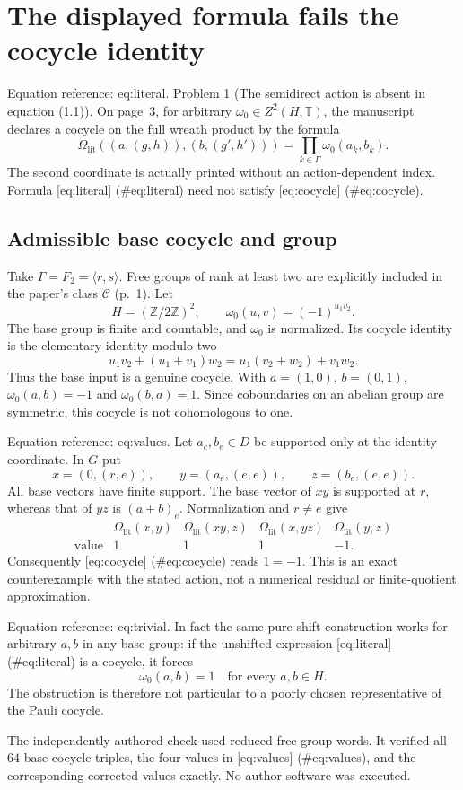 \documentclass[10pt]{article}
\begin{document}
\section*{The displayed formula fails the cocycle identity}
Equation reference: eq:literal. Problem 1 (The semidirect action is absent in equation (1.1)).  On page 3, for arbitrary \(\omega_0\in Z^2(H,\mathbb T)\), the manuscript declares a cocycle on the full wreath product by the formula \[
 \Omega_{\mathrm{lit}}((a,(g,h)),(b,(g',h')))
   =\prod_{k\in\Gamma}\omega_0(a_k,b_k).\] The second coordinate is actually printed without an action-dependent index. Formula [eq:literal] (\#eq:literal) need not satisfy [eq:cocycle] (\#eq:cocycle).\par
\subsection*{Admissible base cocycle and group}
Take \(\Gamma=F_2=\langle r,s\rangle\). Free groups of rank at least two are explicitly included in the paper’s class \(\mathcal C\) (p. 1). Let \[H=(\mathbb Z/2\mathbb Z)^2,\qquad
 \omega_0(u,v)=(-1)^{u_1v_2}.\] The base group is finite and countable, and \(\omega_0\) is normalized. Its cocycle identity is the elementary identity modulo two \[u_1v_2+(u_1+v_1)w_2=u_1(v_2+w_2)+v_1w_2.\] Thus the base input is a genuine cocycle. With \(a=(1,0)\), \(b=(0,1)\), \(\omega_0(a,b)=-1\) and \(\omega_0(b,a)=1\). Since coboundaries on an abelian group are symmetric, this cocycle is not cohomologous to one.\par
Equation reference: eq:values. Let \(a_e,b_e\in D\) be supported only at the identity coordinate. In \(G\) put \[x=(0,(r,e)),\qquad
 y=(a_e,(e,e)),\qquad
 z=(b_e,(e,e)).\] All base vectors have finite support. The base vector of \(xy\) is supported at \(r\), whereas that of \(yz\) is \((a+b)_e\). Normalization and \(r\ne e\) give \[
 \begin{array}{c|cccc}
 &\Omega_{\mathrm{lit}}(x,y)&\Omega_{\mathrm{lit}}(xy,z)&\Omega_{\mathrm{lit}}(x,yz)&\Omega_{\mathrm{lit}}(y,z)\\ \hline
 \text{value}&1&1&1&-1 .
 \end{array}\] Consequently [eq:cocycle] (\#eq:cocycle) reads \(1=-1\). This is an exact counterexample with the stated action, not a numerical residual or finite-quotient approximation.\par
Equation reference: eq:trivial. In fact the same pure-shift construction works for arbitrary \(a,b\) in any base group: if the unshifted expression [eq:literal] (\#eq:literal) is a cocycle, it forces \[
 \omega_0(a,b)=1\quad\text{for every }a,b\in H.\] The obstruction is therefore not particular to a poorly chosen representative of the Pauli cocycle.\par
The independently authored check used reduced free-group words. It verified all \(64\) base-cocycle triples, the four values in [eq:values] (\#eq:values), and the corresponding corrected values exactly. No author software was executed.\par
\end{document}
